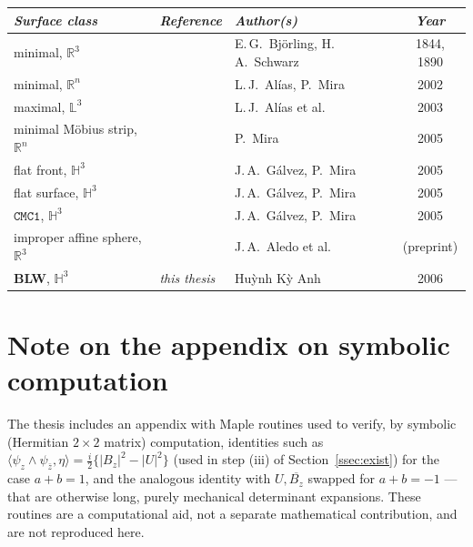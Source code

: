 \documentclass[11pt,a4paper]{article}
\newcommand{\RR}{\mathbb{R}}
\newcommand{\Hyp}{\mathbb{H}^3}                      %
\newcommand{\ip}[2]{\langle #1,#2\rangle}            %
\theoremstyle{plain}
\theoremstyle{definition}
\theoremstyle{remark}
\begin{document}
\begin{center}
\begin{tabular}{lll c}
\textit{Surface class} & \textit{Reference} & \textit{Author(s)} & \textit{Year}\\
\hline
minimal, $\RR^3$ & \cite{FUNG} & E.\,G.\ Björling, H.\,A.\ Schwarz & 1844, 1890\\
minimal, $\RR^n$ & \cite{AM} & L.\,J.\ Alías, P.\ Mira & 2002\\
maximal, $\mathbb L^3$ & \cite{ACM} & L.\,J.\ Alías et al. & 2003\\
minimal Möbius strip, $\RR^n$ & \cite{MIRA} & P.\ Mira & 2005\\
flat front, $\Hyp$ & \cite{GMM5} & J.\,A.\ Gálvez, P.\ Mira & 2005\\
flat surface, $\Hyp$ & \cite{GMM5} & J.\,A.\ Gálvez, P.\ Mira & 2005\\
$\mathtt{CMC1}$, $\Hyp$ & \cite{GMM1} & J.\,A.\ Gálvez, P.\ Mira & 2005\\
improper affine sphere, $\RR^3$ & \cite{ACG} & J.\,A.\ Aledo et al. & (preprint)\\
\textbf{BLW}, $\Hyp$ & \textit{this thesis} & Huỳnh Kỳ Anh & 2006\\
\end{tabular}
\end{center}

\section{Note on the appendix on symbolic computation}

The thesis includes an appendix with Maple routines used to verify, by
symbolic (Hermitian $2\times2$ matrix) computation, identities such as
$\ip{\psi_z\wedge\psi_{\bar z}}\eta = \tfrac i2\{|B_z|^2-|U|^2\}$ (used in
step (iii) of Section~\ref{ssec:exist}) for the
case $a+b=1$, and the analogous identity with $U,\overline{B_z}$ swapped
for $a+b=-1$ — that are otherwise long, purely mechanical determinant
expansions. These routines are a computational aid, not a separate
mathematical contribution, and are not reproduced here.
\end{document}

